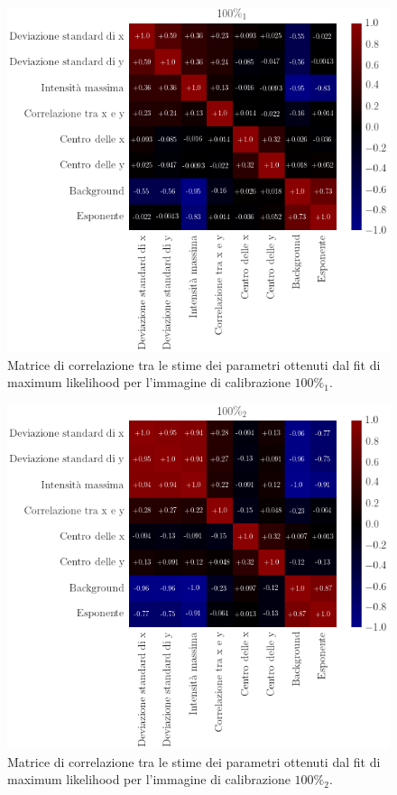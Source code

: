 \begin{figure}
 \centering
 \includegraphics[scale=.48]{img/CAP4c3.png}
 \caption{\small{Matrice di correlazione tra le stime dei parametri ottenuti dal fit di maximum likelihood per l'immagine di calibrazione $100\%_1$.}}
 \label{fig:c3}
\end{figure}

\begin{figure}
 \centering
 \includegraphics[scale=.48]{img/CAP4c4.png}
 \caption{\small{Matrice di correlazione tra le stime dei parametri ottenuti dal fit di maximum likelihood per l'immagine di calibrazione $100\%_2$.}}
 \label{fig:c4}
\end{figure}


